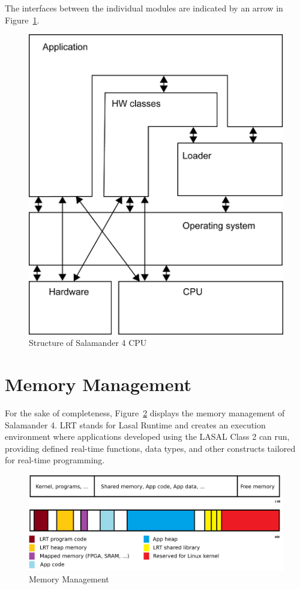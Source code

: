 \documentclass[MMR,Master,english]{twbook}
\begin{document}
\clearpage
\noindent The interfaces between the individual modules are indicated by an arrow in Figure~\ref{fig:lasal_cpu}.

\begin{figure}[H]
	\centering
	\includegraphics[width=0.5\columnwidth]{img/Software-Struktur_einer_LASAL_CPU.png}
	\caption[Structure of Salamander 4 CPU]{Structure of Salamander 4 CPU}
	\label{fig:lasal_cpu}
\end{figure}

\section{Memory Management}
\noindent For the sake of completeness, Figure~\ref{fig:memory_management} displays the memory management of Salamander 4. LRT stands for Lasal Runtime and creates an execution environment where applications developed using the LASAL Class 2 can run, providing defined real-time functions, data types, and other constructs tailored for real-time programming.

\begin{figure}[H]
	\centering
	\includegraphics[width=0.8\columnwidth]{img/RAM_Memory_management.png}
	\caption[Memory Management]{Memory Management}
	\label{fig:memory_management}
\end{figure}

\clearpage
\end{document}
